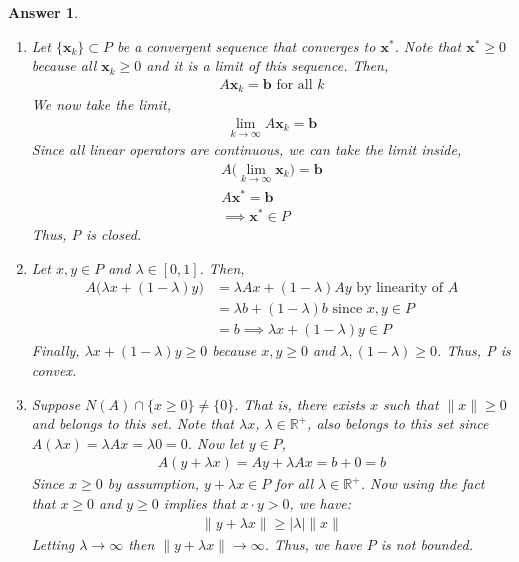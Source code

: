 \documentclass[12pt]{article}
\theoremstyle{colon}
\newtheorem*{answer}{Answer}
\begin{document}
\begin{answer}
  \leavevmode
  \begin{enumerate}
    \item Let $\{ \textbf{x}_k \} \subset P$ be a convergent sequence that converges to $\textbf{x}^*$. Note that $\textbf{x}^* \geq 0$ because all $\textbf{x}_k \geq 0$ and it is a limit of this sequence. Then,
      \begin{gather*}
        A \textbf{x}_k = \textbf{b} \text{ for all } k
      \end{gather*}
      We now take the limit,
      \begin{gather*}
        \lim_{k \rightarrow \infty} A \textbf{x}_k = \textbf{b}
      \end{gather*}
      Since all linear operators are continuous, we can take the limit inside,
      \begin{gather*}
        A \big( \lim_{k \rightarrow \infty} \textbf{x}_k \big) = \textbf{b} \\
        A \textbf{x}^* = \textbf{b} \\
        \implies \textbf{x}^* \in P
      \end{gather*}
      Thus, P is closed.
    \item Let $x, y \in P$ and $\lambda \in [0,1]$. Then,
      \begin{align*}
        A \big( \lambda x + (1-\lambda) y \big) &= \lambda Ax + (1-\lambda) Ay \text{ by linearity of } A \\
        &= \lambda b + (1-\lambda)b \text{ since } x, y \in P \\
        &= b \implies \lambda x + (1-\lambda) y \in P
      \end{align*}
      Finally, $\lambda x + (1-\lambda) y \geq 0$ because $x, y \geq 0$ and $\lambda, (1-\lambda) \geq 0$. Thus, P is convex.
    \item  Suppose $N(A) \cap \{ x \geq 0 \} \neq \{ 0 \}$. That is, there exists $x$ such that $\lVert x \rVert \geq 0$ and belongs to this set. Note that $\lambda x$, $\lambda \in \mathbb{R}^+$, also belongs to this set since $A(\lambda x) = \lambda Ax = \lambda 0 = 0$. Now let $y \in P$,
    \begin{gather*}
      A(y + \lambda x) = Ay + \lambda Ax = b + 0 = b
    \end{gather*}
    Since $x \geq 0$ by assumption, $y + \lambda x \in P$ for all $\lambda \in \mathbb{R}^+$. Now using the fact that $x \geq 0$ and $y \geq 0$ implies that $x \cdot y > 0$, we have:
    \begin{gather*}
      \lVert y + \lambda x \rVert \geq \lvert \lambda \rvert \lVert x \rVert
    \end{gather*}
    Letting $\lambda \rightarrow \infty$ then $\lVert y + \lambda x \rVert \rightarrow \infty$. Thus, we have $P$ is not bounded.


\end{enumerate}
\end{answer}
\end{document}
